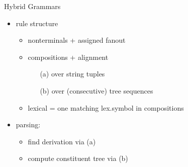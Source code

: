 \documentclass[slides]{subfiles}
\begin{document}
    \begin{frame}{Hybrid Grammars \citep{Ned14}}
        \begin{minipage}{.58\linewidth}
            \begin{overprint}
                    \resizebox{\linewidth}{!}{
                        }
                    \resizebox{\linewidth}{!}{
                        }
            \end{overprint}
        \end{minipage}
        \hfill
        \begin{minipage}{.4\linewidth}
            \begin{itemize}
                \item rule structure
                    \begin{itemize}
                        \item \alert<2|handout:0>{nonterminals} + \alert<5-8|handout:0>{assigned fanout}
                        \item \alert<3-12|handout:0>{compositions} + \alert<11-12|handout:0>{alignment}
                            \begin{itemize}
                                \item[(a)] \alert<3-8|handout:0>{over string tuples}
                                \item[(b)] \alert<9-10|handout:0>{over (consecutive) tree sequences}
                            \end{itemize}
                        \item<14-> lexical = one matching lex.\@ symbol in compositions
                    \end{itemize}
                \item<22-> parsing:
                \begin{itemize}
                    \item find derivation via (a)
                    \item compute constituent tree via (b)
                \end{itemize}
            \end{itemize}
        \end{minipage}
    \end{frame}
\end{document}
